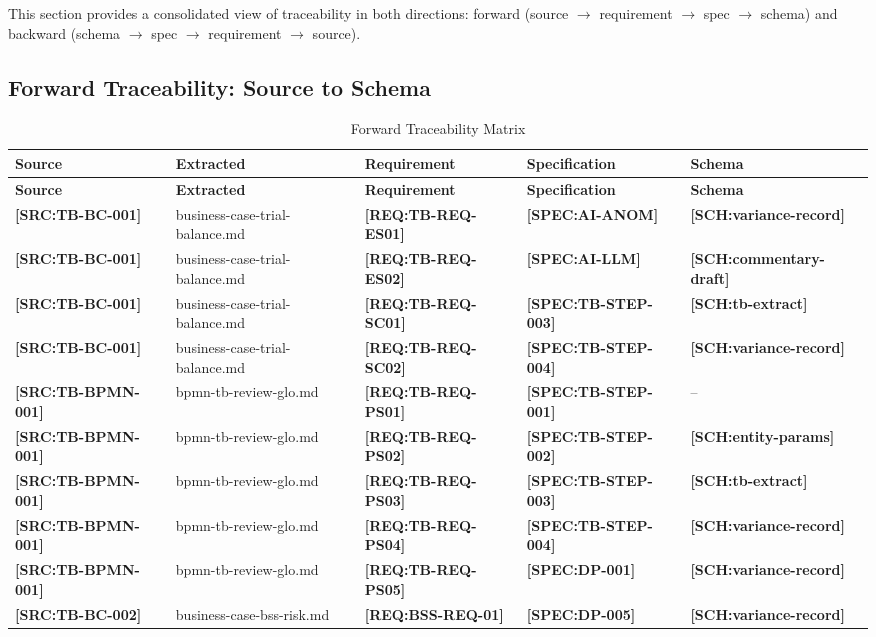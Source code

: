 \documentclass[11pt,a4paper]{article}
\newcommand{\srcref}[1]{\textcolor{sourcegreen}{\textbf{[SRC:#1]}}}
\newcommand{\reqref}[1]{\textcolor{reqpurple}{\textbf{[REQ:#1]}}}
\newcommand{\specref}[1]{\textcolor{specblue}{\textbf{[SPEC:#1]}}}
\newcommand{\schemaref}[1]{\textcolor{schemaorg}{\textbf{[SCH:#1]}}}
\begin{document}
This section provides a consolidated view of traceability in both directions:
forward (source $\rightarrow$ requirement $\rightarrow$ spec $\rightarrow$ schema) and 
backward (schema $\rightarrow$ spec $\rightarrow$ requirement $\rightarrow$ source).

\subsection{Forward Traceability: Source to Schema}

\begin{longtable}{@{}C{2cm}C{2.5cm}C{2.5cm}C{3cm}C{3cm}@{}}
\caption{Forward Traceability Matrix} \\
\toprule
\textbf{Source} & \textbf{Extracted} & \textbf{Requirement} & \textbf{Specification} & \textbf{Schema} \\
\midrule
\endfirsthead
\toprule
\textbf{Source} & \textbf{Extracted} & \textbf{Requirement} & \textbf{Specification} & \textbf{Schema} \\
\midrule
\endhead
\srcref{TB-BC-001} & business-case-trial-balance.md & \reqref{TB-REQ-ES01} & \specref{AI-ANOM} & \schemaref{variance-record} \\
\srcref{TB-BC-001} & business-case-trial-balance.md & \reqref{TB-REQ-ES02} & \specref{AI-LLM} & \schemaref{commentary-draft} \\
\srcref{TB-BC-001} & business-case-trial-balance.md & \reqref{TB-REQ-SC01} & \specref{TB-STEP-003} & \schemaref{tb-extract} \\
\srcref{TB-BC-001} & business-case-trial-balance.md & \reqref{TB-REQ-SC02} & \specref{TB-STEP-004} & \schemaref{variance-record} \\
\srcref{TB-BPMN-001} & bpmn-tb-review-glo.md & \reqref{TB-REQ-PS01} & \specref{TB-STEP-001} & -- \\
\srcref{TB-BPMN-001} & bpmn-tb-review-glo.md & \reqref{TB-REQ-PS02} & \specref{TB-STEP-002} & \schemaref{entity-params} \\
\srcref{TB-BPMN-001} & bpmn-tb-review-glo.md & \reqref{TB-REQ-PS03} & \specref{TB-STEP-003} & \schemaref{tb-extract} \\
\srcref{TB-BPMN-001} & bpmn-tb-review-glo.md & \reqref{TB-REQ-PS04} & \specref{TB-STEP-004} & \schemaref{variance-record} \\
\srcref{TB-BPMN-001} & bpmn-tb-review-glo.md & \reqref{TB-REQ-PS05} & \specref{DP-001} & \schemaref{variance-record} \\
\srcref{TB-BC-002} & business-case-bss-risk.md & \reqref{BSS-REQ-01} & \specref{DP-005} & \schemaref{variance-record} \\
\bottomrule
\end{longtable}
\end{document}
